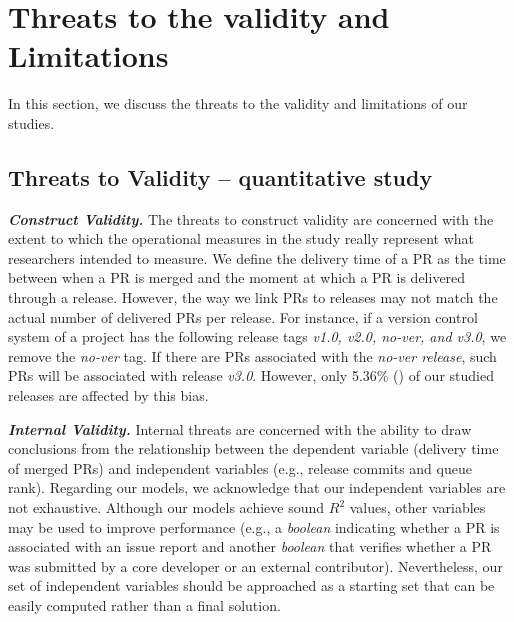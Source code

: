 \section{Threats to the validity and Limitations}\label{sec_threats_to_the_validity} 

In this section, we discuss the threats to the validity and limitations of our studies.

\subsection{\textbf{Threats to Validity -- quantitative study}}

\textit{\textbf{Construct Validity.}} The threats to construct validity are concerned with the extent to which the
operational measures in the study really represent what researchers intended to measure. We define the delivery time of a PR as the time between when a PR is merged and the moment at which a PR is delivered through a release. However, the way we link PRs to releases may not match the actual number of delivered PRs per release. For instance, if a version control system of a project has the following release tags \textit{v1.0, v2.0, no-ver, and v3.0}, we
remove the \textit{no-ver} tag. If there are PRs associated with the
\textit{no-ver release}, such PRs will be associated with release
\textit{v3.0}. However, only 5.36\% () of our studied
releases are affected by this bias.

\noindent\textit{\textbf{Internal Validity.}} Internal threats are concerned with the
ability to draw conclusions from the relationship between the dependent
variable (delivery time of merged PRs) and independent variables (e.g.,
release commits and queue rank). 
Regarding our models, we acknowledge that our independent variables
are not exhaustive. Although our models achieve sound $R^2$ values, other variables may
be used to improve performance (e.g., a \textit{boolean} indicating whether a PR
is associated with an issue report and another \textit{boolean} that verifies whether a PR was submitted by a core developer or an external contributor). Nevertheless, our set of independent variables
should be approached as a starting set that can be easily computed rather than a final solution.

